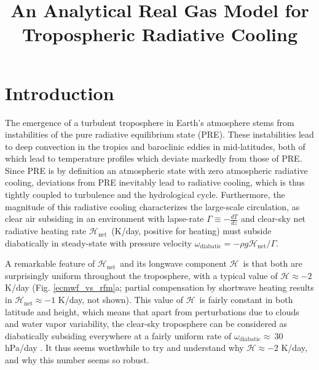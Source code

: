 \documentclass{ametsoc}
\title{An Analytical Real Gas Model for Tropospheric Radiative Cooling}
\affiliation{Princeton University, Princeton, New Jersey}
\newcommand{\der}[2]{\ensuremath{\frac{d #1}{d #2}}}
\newcommand{\ch}{\ensuremath{\mathcal{H}}}
\newcommand{\chnet}{\ensuremath{\ch_\mathrm{net}}}
\newcommand{\omegadiab}{\ensuremath{\omega_{\mathrm{diabatic}}}}
\begin{document}
\maketitle


%
\section {Introduction}
The emergence of a turbulent troposphere in Earth's atmosphere stems from instabilities of the pure radiative equilibrium state (PRE). These instabilities lead to deep convection in the tropics and baroclinic eddies in mid-latitudes, both of which lead to temperature profiles which deviate markedly from those of PRE.  Since PRE is by definition an atmospheric state with zero atmospheric radiative cooling, deviations from PRE inevitably lead to radiative cooling, which is thus tightly coupled to turbulence and the hydrological cycle. Furthermore, the magnitude of this radiative cooling characterizes the large-scale circulation, as clear air subsiding in an environment with lapse-rate $\Gamma \equiv - \der{T}{z}$ and clear-sky net radiative heating rate \chnet\ (K/day, positive for heating)  must subside diabatically in steady-state with pressure velocity $\omegadiab   =  - \rho g\chnet/\Gamma$.

A remarkable feature of \chnet\ and its longwave component \ch\  is that both are  surprisingly uniform throughout the troposphere,  with a typical value of $\ch\approx -2 $K/day  (Fig. \ref{ecmwf_vs_rfm}a; partial compensation by shortwave heating results in $\chnet\approx -1$ K/day, not shown). This value of \ch\ is fairly constant in both latitude and height, which means that apart from perturbations  due to clouds and water vapor variability, the clear-sky troposphere can be considered as diabatically subsiding everywhere at a fairly uniform rate of $\omegadiab\approx\ 30$ hPa/day . It thus seems worthwhile to try and understand why $\ch \approx -2$ K/day, and why this number seems so robust.
\end{document}
